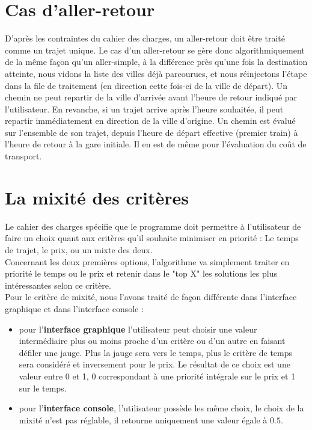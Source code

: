 \documentclass[a4paper,10pt,twoside]{report}
\begin{document}
    
    
    
    
    \section{Cas d'aller-retour}
    D'après les contraintes du cahier des charges, un aller-retour doit être traité comme un trajet unique. Le cas d'un aller-retour se gère donc algorithmiquement de la même façon qu'un aller-simple, à la différence près qu'une fois la destination atteinte, nous vidons la liste des villes déjà parcourues, et nous réinjectons l'étape dans la file de traitement (en direction cette fois-ci de la ville de départ). Un chemin ne peut repartir de la ville d'arrivée avant l'heure de retour indiqué par l'utilisateur. En revanche, si un trajet arrive après l'heure souhaitée, il peut repartir immédiatement en direction de la ville d'origine. Un chemin est évalué sur l'ensemble de son trajet, depuis l'heure de départ effective (premier train) à l'heure de retour à la gare initiale. Il en est de même pour l'évaluation du coût de transport.
    
    
    
    
    \section{La mixité des critères}
    Le cahier des charges spécifie que le programme doit permettre à l'utilisateur de faire un choix quant aux critères qu'il souhaite minimiser en priorité : Le temps de trajet, le prix, ou un mixte des deux.\\
    Concernant les deux premières options, l'algorithme va simplement traiter en priorité le temps ou le prix et retenir dans le "top X" les solutions les plus intéressantes selon ce critère.\\
    Pour le critère de mixité, nous l'avons traité de façon différente dans l'interface graphique et dans l'interface console :\\
    \begin{itemize}
    \item pour l'\textbf{interface graphique} l'utilisateur peut choisir une valeur intermédiaire plus ou moins proche d'un critère ou d'un autre en faisant défiler une jauge. Plus la jauge sera vers le temps, plus le critère de temps sera considéré et inversement pour le prix. Le résultat de ce choix est une valeur entre 0 et 1, 0 correspondant à une priorité intégrale sur le prix et 1 sur le temps.\\
    \item pour l'\textbf{interface console}, l'utilisateur possède les même choix, le choix de la mixité n'est pas réglable, il retourne uniquement une valeur égale à $0.5$.
    \end{itemize}
    
\end{document}
